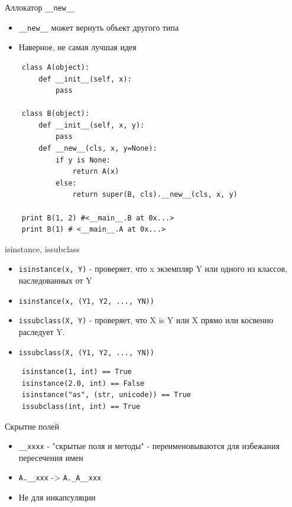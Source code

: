 \documentclass{article}
\begin{document}
\begin{center} Аллокатор \lstinline!__new__! \end{center}
\begin{itemize}
    \item \lstinline!__new__! может вернуть объект другого типа
    \item Наверное, не самая лучшая идея
\end{itemize}
\vspace{15pt}
\begin{lstlisting}
    class A(object):
        def __init__(self, x):
            pass

    class B(object):
        def __init__(self, x, y):
            pass
        def __new__(cls, x, y=None):
            if y is None:
                return A(x)
            else:
                return super(B, cls).__new__(cls, x, y)

    print B(1, 2) #<__main__.B at 0x...>
    print B(1) # <__main__.A at 0x...>    
\end{lstlisting}
\newpage

\begin{center}isinstance, issubclass\end{center}
\begin{itemize}
    \item \lstinline!isinstance(x, Y)! - проверяет, что x экземпляр Y или
              одного из классов, наследованных от Y
    \item \lstinline!isinstance(x, (Y1, Y2, ..., YN))!
    \item \lstinline!issubclass(X, Y)! - проверяет, что X is Y или X
            прямо или косвенно раследует Y.
    \item \lstinline!issubclass(X, (Y1, Y2, ..., YN))!
\end{itemize}
\begin{lstlisting}
    isinstance(1, int) == True
    isinstance(2.0, int) == False
    isinstance("as", (str, unicode)) == True
    issubclass(int, int) == True
\end{lstlisting}
\newpage

\begin{center} Скрытие полей \end{center}
\begin{itemize}
    \item \lstinline!__xxxx! - "скрытые поля и методы" 
        - переименовываются для избежания пересечения имен
    \item \lstinline!A.__xxx! -> \lstinline!A._A__xxx!
    \item Не для инкапсуляции
\end{itemize}
\newpage
\end{document}
